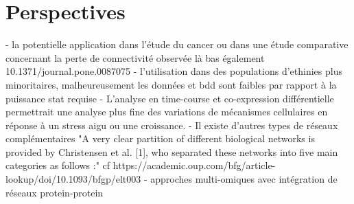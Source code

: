 \section{Perspectives}

- la potentielle application dans l'étude du cancer ou dans une étude comparative concernant la perte de connectivité observée là bas également 10.1371/journal.pone.0087075
- l'utilisation dans des populations d'ethinies plus minoritaires, malheureusement les données et bdd sont faibles par rapport à la puissance stat requise
- L'analyse en time-course et co-expression différentielle permettrait une analyse plus fine des variations de mécanismes cellulaires en réponse à un stress aigu ou une croissance. %
- Il existe d'autres types de réseaux complémentaires "A very clear partition of different biological networks is provided by Christensen et al. [1], who separated these networks into five main categories as follows :" cf https://academic.oup.com/bfg/article-lookup/doi/10.1093/bfgp/elt003
- approches multi-omiques avec intégration de réseaux protein-protein %